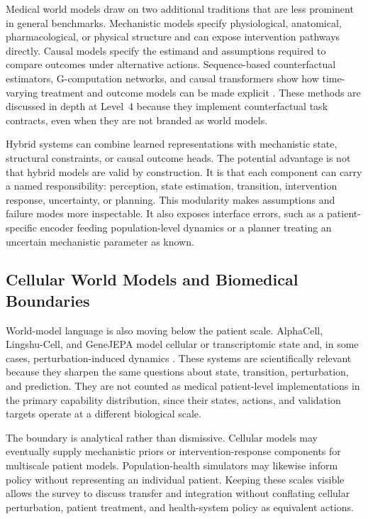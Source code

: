 Medical world models draw on two additional traditions that are less prominent in general benchmarks. Mechanistic models specify physiological, anatomical, pharmacological, or physical structure and can expose intervention pathways directly. Causal models specify the estimand and assumptions required to compare outcomes under alternative actions. Sequence-based counterfactual estimators, G-computation networks, and causal transformers show how time-varying treatment and outcome models can be made explicit \citep{Bica2020CRN,Li2020GNet,Melnychuk2022CausalTransformer,Seedat2022TECDE}. These methods are discussed in depth at Level~4 because they implement counterfactual task contracts, even when they are not branded as world models.

Hybrid systems can combine learned representations with mechanistic state, structural constraints, or causal outcome heads. The potential advantage is not that hybrid models are valid by construction. It is that each component can carry a named responsibility: perception, state estimation, transition, intervention response, uncertainty, or planning. This modularity makes assumptions and failure modes more inspectable. It also exposes interface errors, such as a patient-specific encoder feeding population-level dynamics or a planner treating an uncertain mechanistic parameter as known.

\subsection{Cellular World Models and Biomedical Boundaries}

World-model language is also moving below the patient scale. AlphaCell, Lingshu-Cell, and GeneJEPA model cellular or transcriptomic state and, in some cases, perturbation-induced dynamics \citep{Chuai2026BuildingWorldModel,Zhang2026LingshuCellGenerative,Litman2025GenejepaPredictiveWorld}. These systems are scientifically relevant because they sharpen the same questions about state, transition, perturbation, and prediction. They are not counted as medical patient-level implementations in the primary capability distribution, since their states, actions, and validation targets operate at a different biological scale.

The boundary is analytical rather than dismissive. Cellular models may eventually supply mechanistic priors or intervention-response components for multiscale patient models. Population-health simulators may likewise inform policy without representing an individual patient. Keeping these scales visible allows the survey to discuss transfer and integration without conflating cellular perturbation, patient treatment, and health-system policy as equivalent actions.

